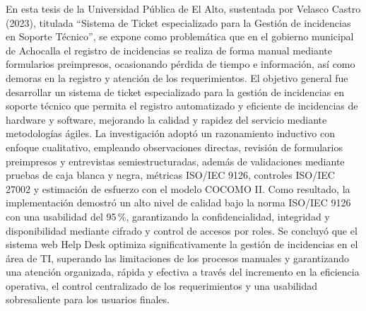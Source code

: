 En esta tesis de la Universidad Pública de El Alto, sustentada por Velasco Castro (2023), titulada ``Sistema de Ticket especializado para la Gestión de incidencias en Soporte Técnico'', se expone como problemática que en el gobierno municipal de Achocalla el registro de incidencias se realiza de forma manual mediante formularios preimpresos, ocasionando pérdida de tiempo e información, así como demoras en la registro y atención de los requerimientos. El objetivo general fue desarrollar un sistema de ticket especializado para la gestión de incidencias en soporte técnico que permita el registro automatizado y eficiente de incidencias de hardware y software, mejorando la calidad y rapidez del servicio mediante metodologías ágiles. La investigación adoptó un razonamiento inductivo con enfoque cualitativo, empleando observaciones directas, revisión de formularios preimpresos y entrevistas semiestructuradas, además de validaciones mediante pruebas de caja blanca y negra, métricas ISO/IEC 9126, controles ISO/IEC 27002 y estimación de esfuerzo con el modelo COCOMO II. Como resultado, la implementación demostró un alto nivel de calidad bajo la norma ISO/IEC 9126 con una usabilidad del 95\,\%, garantizando la confidencialidad, integridad y disponibilidad mediante cifrado y control de accesos por roles. Se concluyó que el sistema web Help Desk optimiza significativamente la gestión de incidencias en el área de TI, superando las limitaciones de los procesos manuales y garantizando una atención organizada, rápida y efectiva a través del incremento en la eficiencia operativa, el control centralizado de los requerimientos y una usabilidad sobresaliente para los usuarios finales.

\vspace{0.8em}

